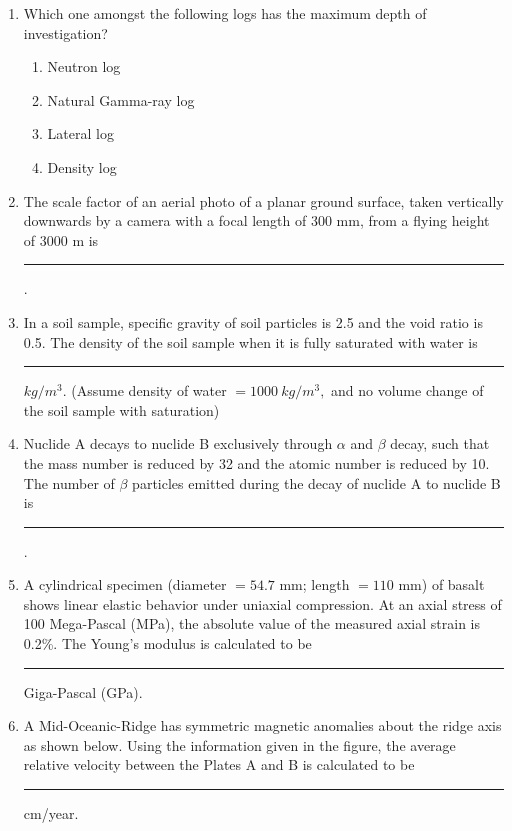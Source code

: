 \documentclass[journal,12pt,onecolumn]{IEEEtran}
\begin{document}
\begin{enumerate}
\item Which one amongst the following logs has the maximum depth of investigation?

\hfill{}
\begin{multicols}{2}
\begin{enumerate}
    \item Neutron log
    \item Natural Gamma-ray log
    \item Lateral log
    \item Density log
\end{enumerate}
\end{multicols}

\item The scale factor of an aerial photo of a planar ground surface, taken vertically downwards by a camera with a focal length of 300 mm, from a flying height of 3000 m is \rule{1cm}{0.15mm}.

\hfill{}

\item In a soil sample, specific gravity of soil particles is 2.5 and the void ratio is 0.5. The density of the soil sample when it is fully saturated with water is \rule{1cm}{0.15mm} $kg/m^{3}$. (Assume density of water $=1000~kg/m^{3},$ and no volume change of the soil sample with saturation)

\hfill{}

\item Nuclide A decays to nuclide B exclusively through $\alpha$ and $\beta$ decay, such that the mass number is reduced by 32 and the atomic number is reduced by 10. The number of $\beta$ particles emitted during the decay of nuclide A to nuclide B is \rule{1cm}{0.15mm}.

\hfill{}

\item A cylindrical specimen (diameter $=54.7$ mm; length $=110$ mm) of basalt shows linear elastic behavior under uniaxial compression. At an axial stress of 100 Mega-Pascal (MPa), the absolute value of the measured axial strain is 0.2\%. The Young's modulus is calculated to be \rule{1cm}{0.15mm} Giga-Pascal (GPa).

\hfill{}

\item A Mid-Oceanic-Ridge has symmetric magnetic anomalies about the ridge axis as shown below. Using the information given in the figure, the average relative velocity between the Plates A and B is calculated to be \rule{1cm}{0.15mm} cm/year.


\end{enumerate}
\end{document}
